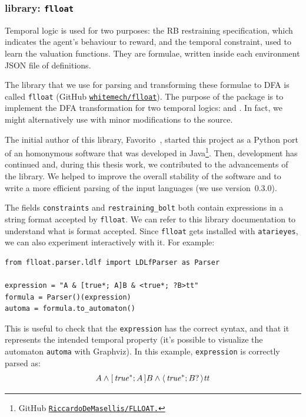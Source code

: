 \subsubsection*{\ldl{} library: \texttt{flloat}}

Temporal logic is used for two purposes: the RB restraining specification,
which indicates the agent's behaviour to reward, and the temporal constraint,
used to learn the valuation functions. They are \ldl{} formulae, written
inside each environment JSON file of definitions.

The library that we use for parsing and transforming these formulae to DFA is
called \texttt{flloat} (GitHub \href{https://github.com/whitemech/flloat}{%
\texttt{whitemech/flloat}}). The purpose of the package is to
implement the DFA transformation for two temporal logics: \ltl{} and \ldl{}.
In fact, we might alternatively use \ltl{} with minor modifications to the
source.

The initial author of this library, Favorito~\cite{bib:favorito-thesis},
started this project as a Python port of an homonymous software that was
developed in Java\footnote{GitHub
\href{https://github.com/RiccardoDeMasellis/FLLOAT}{%
\texttt{RiccardoDeMasellis/FLLOAT.}}}. Then, development has continued and,
during this thesis work, we contributed to the advancements of the
library. We helped to improve the overall stability of the software and to
write a more efficient parsing of the input languages (we use version~0.3.0).

The fields \verb|constraints| and \verb|restraining_bolt| both contain \ldl{}
expressions in a string format accepted by \texttt{flloat}.  We can refer to
this library documentation to understand what is format accepted. Since
\texttt{flloat} gets installed with \texttt{atarieyes}, we can also experiment
interactively with it.  For example:
\begin{lstlisting}[style=python]
from flloat.parser.ldlf import LDLfParser as Parser

expression = "A & [true*; A]B & <true*; ?B>tt"
formula = Parser()(expression)
automa = formula.to_automaton()
\end{lstlisting}
This is useful to check that the \texttt{expression} has the correct syntax,
and that it represents the intended temporal property (it's possible to
visualize the automaton \texttt{automa} with Graphviz). In this example,
\texttt{expression} is correctly parsed as:
\[
	A \land [\, {\text{\textit{true}}^*; A} \,]B \land \langle\, {\text{\textit{true}}^*; B?} \,\rangle \text{\textit{tt}}
\]



